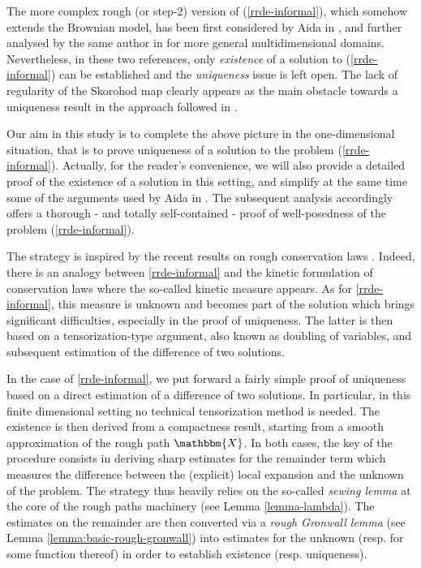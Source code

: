 \documentclass[11pt,reqno,oneside]{amsart}
\numberwithin{equation}{section}
\begin{document}
\smallskip

{The  more complex rough (or step-2) version of (\ref{rrde-informal}), which somehow extends the Brownian model, has been first considered by Aida in \cite{aida_reflected_2015}, and further analysed by the same author in \cite{aida-2016} for more general multidimensional domains. Nevertheless, in these two references, only  {\it existence} of a solution to (\ref{rrde-informal}) can be established and the {\it uniqueness} issue is left open. The lack of regularity of the Skorohod map clearly appears as the main obstacle towards a uniqueness result in the approach followed in \cite{aida_reflected_2015,aida-2016}.}

\smallskip

Our aim in this study is to complete the above picture in the one-dimensional situation, that is to prove uniqueness of a solution to the problem (\ref{rrde-informal}). Actually, for the reader's convenience, we will also provide a detailed proof of the existence of a solution in this setting, and simplify at the same time some of the arguments used by Aida in \cite{aida_reflected_2015,aida-2016}. The subsequent analysis accordingly offers a thorough - and totally self-contained - proof of well-posedness of the problem (\ref{rrde-informal}). 

\smallskip

The strategy is inspired by the recent results on rough conservation laws \cite{conservation-laws}. Indeed, there is an analogy between \eqref{rrde-informal} and the kinetic formulation of conservation laws where the so-called kinetic measure appears. As for \eqref{rrde-informal}, this measure is unknown and becomes part of the solution which brings significant difficulties, especially in the proof of uniqueness. The latter is then based on a tensorization-type argument, also known as doubling of variables, and subsequent estimation of the difference of two solutions.

In the case of \eqref{rrde-informal}, we put forward a fairly simple proof of uniqueness based on a direct estimation of a difference of two solutions. In particular, in this finite dimensional setting no technical tensorization method is needed.
The existence is then derived from a compactness result, starting from a smooth approximation of the rough path $\mathbbm{X}$. In both cases, the key of the procedure consists in deriving sharp estimates for the remainder term which measures the difference between the (explicit) local expansion and the unknown of the problem. The strategy thus heavily relies on the so-called {\it sewing lemma} at the core of the rough paths machinery (see Lemma \ref{lemma-lambda}). The estimates on the remainder are then converted via a \emph{rough Gronwall lemma} (see Lemma \ref{lemma:basic-rough-gronwall}) into estimates for the unknown (resp. for some function thereof) in order to establish  existence (resp. uniqueness). 
\end{document}

